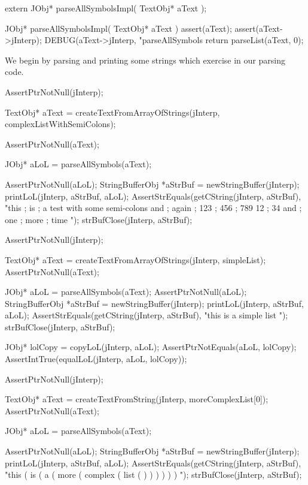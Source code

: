 \startCHeader
extern JObj* parseAllSymbolsImpl(
  TextObj* aText
);
\stopCHeader
{}

\startCCode
JObj* parseAllSymbolsImpl(
  TextObj* aText
) {
  assert(aText);
  assert(aText->jInterp);
  DEBUG(aText->jInterp, "parseAllSymbols %
  return parseList(aText, 0);
}
\stopCCode

We begin by parsing and printing some strings which exercise  in our parsing code. 

\startCTest
  AssertPtrNotNull(jInterp);

  TextObj* aText =
    createTextFromArrayOfStrings(jInterp, complexListWithSemiColons);

  AssertPtrNotNull(aText);

  JObj* aLoL = parseAllSymbols(aText);

  AssertPtrNotNull(aLoL);
  StringBufferObj *aStrBuf = newStringBuffer(jInterp);
  printLoL(jInterp, aStrBuf, aLoL);
  AssertStrEquals(getCString(jInterp, aStrBuf),
    "this ; is ; a test with some semi-colons and ; again ; 123 ; 456 ; 789 12 ; 34 and ; one ; more ; time ");
  strBufClose(jInterp, aStrBuf);
\stopCTest
\stopTestCase

\startCTest
  AssertPtrNotNull(jInterp);

  TextObj* aText =
    createTextFromArrayOfStrings(jInterp, simpleList);
  AssertPtrNotNull(aText);

  JObj* aLoL = parseAllSymbols(aText);
  AssertPtrNotNull(aLoL);
  StringBufferObj *aStrBuf = newStringBuffer(jInterp);
  printLoL(jInterp, aStrBuf, aLoL);
  AssertStrEquals(getCString(jInterp, aStrBuf), "this is a simple list ");
  strBufClose(jInterp, aStrBuf);

  JObj* lolCopy = copyLoL(jInterp, aLoL);
  AssertPtrNotEquals(aLoL, lolCopy);
  AssertIntTrue(equalLoL(jInterp, aLoL, lolCopy));
\stopCTest
\stopTestCase

\startCTest
  AssertPtrNotNull(jInterp);

  TextObj* aText =
    createTextFromString(jInterp, moreComplexList[0]);
  AssertPtrNotNull(aText);

  JObj* aLoL = parseAllSymbols(aText);

  AssertPtrNotNull(aLoL);
  StringBufferObj *aStrBuf = newStringBuffer(jInterp);
  printLoL(jInterp, aStrBuf, aLoL);
  AssertStrEquals(getCString(jInterp, aStrBuf),
    "this ( is ( a ( more ( complex ( list ( ) ) ) ) ) ) ");
  strBufClose(jInterp, aStrBuf);
\stopCTest
\stopTestCase

